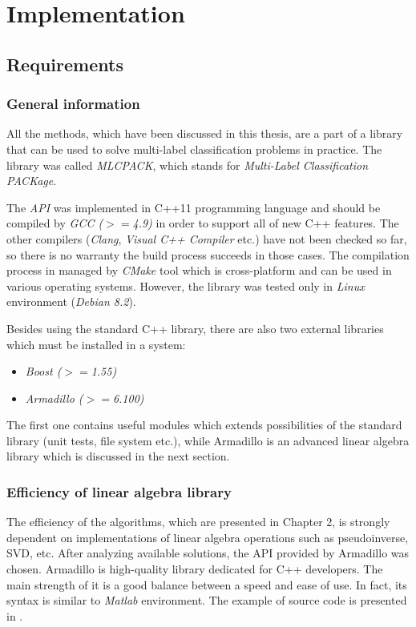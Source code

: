 \chapter{Implementation}

\section{Requirements}

\subsection{General information}
All the methods, which have been discussed in this thesis, are a part of a library that can be used to solve multi-label classification problems in practice. The library was called \textit{MLCPACK}, which stands for \textit{Multi-Label Classification PACKage}. 

The \textit{API} was implemented in C++11 programming language and should be compiled by \textit{GCC ($>=$4.9)} in order to support all of new C++ features. The other compilers (\textit{Clang}, \textit{Visual C++ Compiler} etc.) have not been checked so far, so there is no warranty the build process succeeds in those cases.  The compilation process in managed by \textit{CMake} tool \citep{CMake} which is cross-platform and can be used in various operating systems. However, the library was tested only in \textit{Linux} environment (\textit{Debian 8.2}). 

Besides using the standard C++ library, there are also two external libraries which must be installed in a system: 

\begin{itemize}
    \item \textit{Boost ($>=$1.55)}
    \item \textit{Armadillo ($>=$6.100)}
\end{itemize}
The first one contains useful modules which extends possibilities of the standard library (unit tests, file system etc.), while Armadillo is an advanced linear algebra library which is discussed in the next section.  


\subsection{Efficiency of linear algebra library}

The efficiency of the algorithms, which are presented in Chapter 2, is strongly dependent on implementations of linear algebra operations such as pseudoinverse, SVD, etc. After analyzing available solutions, the API provided by Armadillo was chosen. Armadillo is high-quality library dedicated for C++ developers. The main strength of it is a good balance between a speed and ease of use. In fact, its syntax is similar to \textit{Matlab} environment. The example of source code is presented in .

